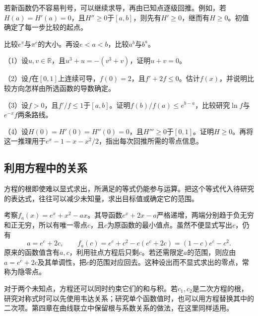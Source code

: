 若新函数仍不容易判号，可以继续求导，再由已知点逐级回推。例如，若\(H(a)=H'(a)=0\)，且\(H''\ge0\)于\([a,b]\)，则先有\(H'\ge0\)，继而有\(H\ge0\)。初值确定了每一步比较的起点。

\begin{example}
比较\(e^\pi\)与\(\pi^e\)的大小。再设\(e<a<b\)，比较\(a^b\)与\(b^a\)。
\end{example}

\newpage
\begin{exercise}
\mbox{}\par\nobreak

\begin{samepage}
（1）设\(u,v\in\mathbb R\)，且\(u^3+u=-(v^3+v)\)，证明\(u+v=0\)。
\par
\end{samepage}

\begin{samepage}
（2）设\(f\)在\([0,1]\)上连续可导，\(f(0)=2\)，且\(f'+2f\le0\)。估计\(f(x)\)，并说明比较方向怎样由所选函数的导数确定。
\par
\end{samepage}

（3）设\(f>0\)，且\(f'/f\le1\)于\([a,b]\)。证明\(f(b)/f(a)\le e^{b-a}\)，比较研究\(\ln f\)与\(e^{-x}f\)两条路线。

（4）设\(H(0)=H'(0)=H''(0)=0\)，且\(H'''\ge0\)于\([0,1]\)。证明\(H\ge0\)。再将这一推理用于\(e^x-1-x-x^2/2\)，指出每次回推所需的零点信息。
\end{exercise}

\subsection{利用方程中的关系}

方程的根即使难以显式求出，所满足的等式仍能参与运算。把这个等式代入待研究的表达式，往往可以减少未知量，求出目标值或确定它的范围。

考察\(f_a(x)=e^x+x^2-ax\)。其导函数\(e^x+2x-a\)严格递增，两端分别趋于负无穷和正无穷，所以有唯一零点\(c\)，且\(c\)为原函数的最小值点。虽然不便显式写出\(c\)，仍有
\begin{equation*}
 a=e^c+2c,\qquad
 f_a(c)=e^c+c^2-c(e^c+2c)=(1-c)e^c-c^2.
\end{equation*}
原来的函数值含有\(a,c\)，利用驻点方程后只剩\(c\)。若还需限定\(a\)的范围，则应由\(a=e^c+2c\)及其单调性，把\(c\)的范围对应回去。这种设出而不显式求出的零点，常称为隐零点。

对于两个未知点，方程还可以同时约束它们的和与积。若\(c_1,c_2\)是二次方程的根，研究对称式时可以先使用韦达关系；研究单个函数值时，也可以用方程替换其中的二次项。第四章在曲线联立中保留根与系数关系的做法，在这里同样适用。

